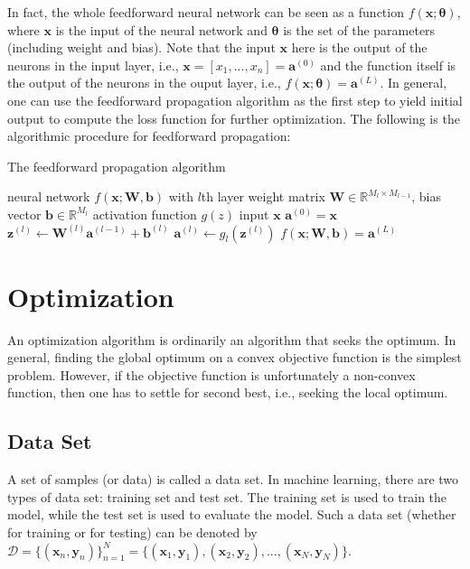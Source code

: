 \documentclass[
	parskip, 			   %
	twoside, 			   %
	DIV=14, 			   %
	BCOR=15.0mm, 		   %
	headsepline, 		   %
	open=right, 		   %
	captions=tableheading, %
	bibliography=totoc,    %
	numbers=noenddot       %
]{scrreprt}
\begin{document}
In fact, the whole feedforward neural network can be seen as a function $f(\mathbf{x};\mathbf{\theta})$, where $\mathbf{x}$ is the input of the neural network and $\mathbf{\theta}$ is the set of the parameters (including weight and bias). Note that the input $\mathbf{x}$ here is the output of the neurons in the input layer, i.e., $\mathbf{x}=[x_1, ..., x_n]=\mathbf{a}^{(0)}$ and the function itself is the output of the neurons in the ouput layer, i.e., $f(\mathbf{x};\mathbf{\theta})=\mathbf{a}^{(L)}$. In general, one can use the feedforward propagation algorithm as the first step to yield initial output to compute the loss function for further optimization. The following is the algorithmic procedure for feedforward propagation:


\clearpage
\begin{algorithm}[h!]
\caption{The feedforward propagation algorithm}
\label{alg:feedforward_alg}
    \begin{algorithmic}
    \Require neural network $f(\mathbf{x};\mathbf{W},\mathbf{b})$ with $l$th layer
    \Require weight matrix $\mathbf{W} \in \mathbb{R}^{M_{l} \times M_{l-1}}$, bias vector $\mathbf{b} \in \mathbb{R}^{M_{l}}$
    \Require activation function $g(z)$
    \Require input $\mathbf{x}$
    \State $\mathbf{a}^{(0)}=\mathbf{x}$ 
            \State $\mathbf{z}^{(l)} \gets \mathbf{W}^{(l)} \mathbf{a}^{(l-1)} + \mathbf{b}^{(l)}$ 
            \State $\mathbf{a}^{(l)} \gets g_{l}(\mathbf{z}^{(l)})$  
            \State {}
        \EndFor
    \EndFor
    \State \Return $f(\mathbf{x};\mathbf{W},\mathbf{b})=\mathbf{a}^{(L)}$ 
    \end{algorithmic}
\end{algorithm}

\section{Optimization}
An optimization algorithm is ordinarily an algorithm that seeks the optimum. In general, finding the global optimum on a convex objective function is the simplest problem. However, if the objective function is unfortunately a non-convex function, then one has to settle for second best, i.e., seeking the local optimum.

\subsection{Data Set}
A set of samples (or data) is called a data set. In machine learning, there are two types of data set: training set and test set. The training set is used to train the model, while the test set is used to evaluate the model. Such a data set (whether for training or for testing) can be denoted by $\mathcal{D}=\{ (\mathbf{x}_{n}, \mathbf{y}_{n}) \}_{n=1}^{N} = \{ (\mathbf{x}_{1}, \mathbf{y}_{1}),  (\mathbf{x}_{2}, \mathbf{y}_{2}), ..., (\mathbf{x}_{N}, \mathbf{y}_{N}) \}$.
\end{document}

